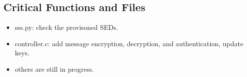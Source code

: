 \documentclass[11pt,oneside,onecolumn,letterpaper]{article}
\begin{document}
\subsection{Critical Functions and Files}
\begin{itemize}
  \item sss.py: check the provisoned SEDs.
  \item controller.c: add message encryption, decryption, and authentication, update keys.
  \item others are still in progress.
\end{itemize}



\end{document}
